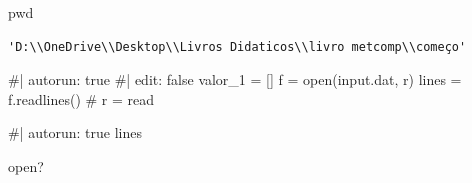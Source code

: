 \documentclass[
  letterpaper,
  DIV=11,
  numbers=noendperiod]{scrreprt}
\newenvironment{Shaded}{\begin{snugshade}}{\end{snugshade}}
\newcommand{\BuiltInTok}[1]{\textcolor[rgb]{0.00,0.23,0.31}{#1}}
\newcommand{\NormalTok}[1]{\textcolor[rgb]{0.00,0.23,0.31}{#1}}
\begin{document}
\begin{Shaded}
\begin{Highlighting}[]
\NormalTok{pwd}
\end{Highlighting}
\end{Shaded}

\begin{verbatim}
'D:\\OneDrive\\Desktop\\Livros Didaticos\\livro metcomp\\começo'
\end{verbatim}

\begin{Shaded}
\begin{Highlighting}[]
\NormalTok{\#| autorun: true}
\NormalTok{\#| edit: false}
\NormalTok{valor\_1 = []}
\NormalTok{f = open(\textquotesingle{}input.dat\textquotesingle{}, \textquotesingle{}r\textquotesingle{})}
\NormalTok{lines = f.readlines()  \# r = read}
\end{Highlighting}
\end{Shaded}

\begin{Shaded}
\begin{Highlighting}[]
\NormalTok{\#| autorun: true}
\NormalTok{lines}
\end{Highlighting}
\end{Shaded}

\begin{Shaded}
\begin{Highlighting}[]
\BuiltInTok{open}\NormalTok{?}
\end{Highlighting}
\end{Shaded}
\end{document}
